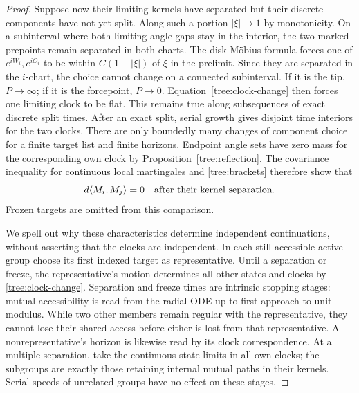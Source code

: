 \begin{proof}
Suppose now their limiting kernels have separated but their discrete
components have not yet split.  Along such a portion $|\xi|\to1$ by
monotonicity.  On a subinterval where both limiting angle gaps stay in
the interior, the two marked prepoints remain separated in both
charts.  The disk M\"obius formula forces one of
$e^{iW_i},e^{iO_i}$ to be within $C(1-|\xi|)$ of $\xi$ in the
prelimit.  Since they are separated in the $i$-chart, the choice cannot
change on a connected subinterval.  If it is the tip, $P\to\infty$;
if it is the forcepoint, $P\to0$.  Equation~\eqref{tree:clock-change}
then forces one limiting clock to be flat.  This remains true along
subsequences of exact discrete split times.  After an exact split,
serial growth gives disjoint time interiors for the two clocks.
There are only boundedly many changes of component choice for a finite
target list and finite horizons.  Endpoint angle sets have zero mass
for the corresponding own clock by Proposition~\ref{tree:reflection}.
The covariance inequality for continuous local martingales and
\eqref{tree:brackets} therefore show that
\begin{equation}\label{tree:orthogonal}
 d\langle M_i,M_j\rangle=0
 \quad\hbox{after their kernel separation}.
\end{equation}
Frozen targets are omitted from this comparison.

We spell out why these characteristics determine independent
continuations, without asserting that the clocks are independent.
In each still-accessible active group choose its first indexed target
as representative.  Until a separation or freeze, the representative's
motion determines all other states and clocks by
\eqref{tree:clock-change}.  Separation and freeze times are intrinsic
stopping stages: mutual accessibility is read from the radial ODE up
to first approach to unit modulus.  While two other members remain
regular with the representative, they cannot lose their shared access
before either is lost from that representative.  A nonrepresentative's
horizon is likewise read by its clock correspondence.  At a multiple
separation, take the continuous state limits in all own clocks; the
subgroups are exactly those retaining internal mutual paths in their
kernels.  Serial speeds of unrelated groups have no effect on these
stages.


\end{proof}
